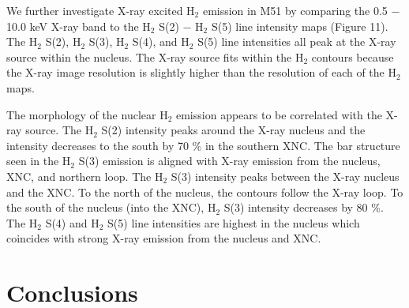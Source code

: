 \documentclass[manuscript]{aastex}
\begin{document}


We further investigate X-ray excited $\mathrm{H_2}$ emission in M51 by comparing the 0.5 $-$ 10.0 keV X-ray band to the $\mathrm{H_2}$ S(2) $-$ $\mathrm{H_2}$ S(5) line intensity maps (Figure 11).   The $\mathrm{H_2}$ S(2), $\mathrm{H_2}$ S(3), $\mathrm{H_2}$ S(4), and $\mathrm{H_2}$ S(5) line intensities all peak at the X-ray source within the nucleus.  The X-ray source fits within the $\mathrm{H_2}$ contours because the X-ray image resolution is slightly higher than the resolution of each of the $\mathrm{H_2}$ maps.  

The morphology of the nuclear $\mathrm{H_2}$ emission appears to be correlated with the X-ray source.  The $\mathrm{H_2}$ S(2) intensity peaks around the X-ray nucleus and the intensity decreases to the south by 70 \% in the southern XNC.  The bar structure seen in the $\mathrm{H_2}$ S(3) emission is aligned with X-ray emission from the nucleus, XNC, and northern loop.  The $\mathrm{H_2}$ S(3) intensity peaks between the X-ray nucleus and the XNC.  To the north of the nucleus, the contours follow the X-ray loop.  To the south of the nucleus (into the XNC), $\mathrm{H_2}$ S(3) intensity decreases by 80 \%.  The $\mathrm{H_2}$ S(4) and $\mathrm{H_2}$ S(5) line intensities are highest in the nucleus which coincides with strong X-ray emission from the nucleus and XNC.

\section{Conclusions}
\end{document}
